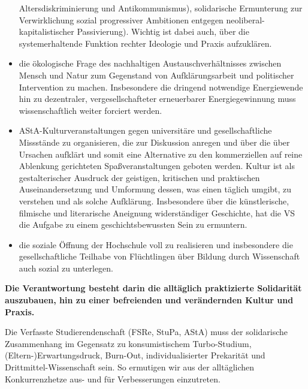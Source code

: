 \documentclass[ngerman,headheight=70pt]{scrartcl}
\begin{document}
\begin{itemize}
              Altersdiskriminierung und Antikommunismus), solidarische Ermunterung
              zur Verwirklichung sozial progressiver Ambitionen entgegen
              neoliberal-kapitalistischer Passivierung). Wichtig ist dabei auch,
              über die systemerhaltende Funktion rechter Ideologie und Praxis
              aufzuklären.
        \item die ökologische Frage des nachhaltigen Austauschverhältnisses
              zwischen Mensch und Natur zum Gegenstand von Aufklärungsarbeit und
              politischer Intervention zu machen. Insbesondere die dringend
              notwendige Energiewende hin zu dezentraler, vergesellschafteter
              erneuerbarer Energiegewinnung muss wissenschaftlich weiter
              forciert werden.
        \item AStA-Kulturveranstaltungen gegen universitäre und gesellschaftliche
              Missstände zu organisieren, die zur Diskussion anregen und über die
              über Ursachen aufklärt und somit eine Alternative zu den
              kommerziellen auf reine Ablenkung gerichteten Spaßveranstaltungen
              geboten werden. Kultur ist als gestalterischer Ausdruck der geistigen,
              kritischen und praktischen Auseinandersetzung und Umformung dessen,
              was einen täglich umgibt, zu verstehen und als solche Aufklärung.
              Insbesondere über die künstlerische, filmische und literarische
              Aneignung widerständiger Geschichte, hat die VS die Aufgabe zu
              einem geschichtsbewussten Sein zu ermuntern.
        \item die soziale Öffnung der Hochschule voll zu realisieren und
              insbesondere die gesellschaftliche Teilhabe von Flüchtlingen über
              Bildung durch Wissenschaft auch sozial zu unterlegen.
    \end{itemize}

    \textbf{Die Verantwortung besteht darin die alltäglich praktizierte
    Solidarität auszubauen, hin zu einer befreienden und verändernden Kultur
    und Praxis.}

    Die Verfasste Studierendenschaft (FSRe, StuPa, AStA) muss der solidarische
    Zusammenhang im Gegensatz zu konsumistischem Turbo-Studium,
    (Eltern-)Erwartungsdruck, Burn-Out, individualisierter Prekarität und
    Drittmittel-Wissenschaft sein. So ermutigen wir aus der alltäglichen
    Konkurrenzhetze aus- und für Verbesserungen einzutreten.
\end{document}
